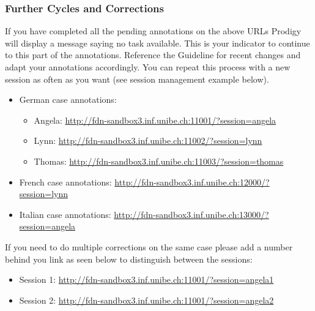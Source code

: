 \documentclass{article}
\begin{document}
\subsubsection{Further Cycles and Corrections}\label{2_cycle}
If you have completed all the pending annotations on the above URLs Prodigy will display a message saying no task available. This is your indicator to continue to this part of the annotations. Reference the Guideline for recent changes and adapt your annotations accordingly. You can repeat this process with a new session as often as you want (see session management example below).
\begin{itemize}
\item German case annotations:
\begin{itemize}
\item Angela: \href{http://fdn-sandbox3.inf.unibe.ch:11001/?session=angela}{http://fdn-sandbox3.inf.unibe.ch:11001/?session=angela}
    \item Lynn: \href{http://fdn-sandbox3.inf.unibe.ch:11002/?session=lynn}{http://fdn-sandbox3.inf.unibe.ch:11002/?session=lynn}
    \item Thomas: \href{http://fdn-sandbox3.inf.unibe.ch:11003/?session=thomas}{http://fdn-sandbox3.inf.unibe.ch:11003/?session=thomas}

\end{itemize}
\item French case annotations: \href{http://fdn-sandbox3.inf.unibe.ch:12001/?session=lynn}{http://fdn-sandbox3.inf.unibe.ch:12000/?session=lynn}
    \item Italian case annotations: \href{http://fdn-sandbox3.inf.unibe.ch:13001/?session=angela}{http://fdn-sandbox3.inf.unibe.ch:13000/?session=angela}
\end{itemize}




If you need to do multiple corrections on the same case please add a number behind you link as seen below to distinguish between the sessions:

\begin{itemize}
\item Session 1: \href{http://fdn-sandbox3.inf.unibe.ch:11001/?session=angela1}{http://fdn-sandbox3.inf.unibe.ch:11001/?session=angela1}
\item Session 2: \href{http://fdn-sandbox3.inf.unibe.ch:11001/?session=angela2}{http://fdn-sandbox3.inf.unibe.ch:11001/?session=angela2}
\end{itemize}
\end{document}
